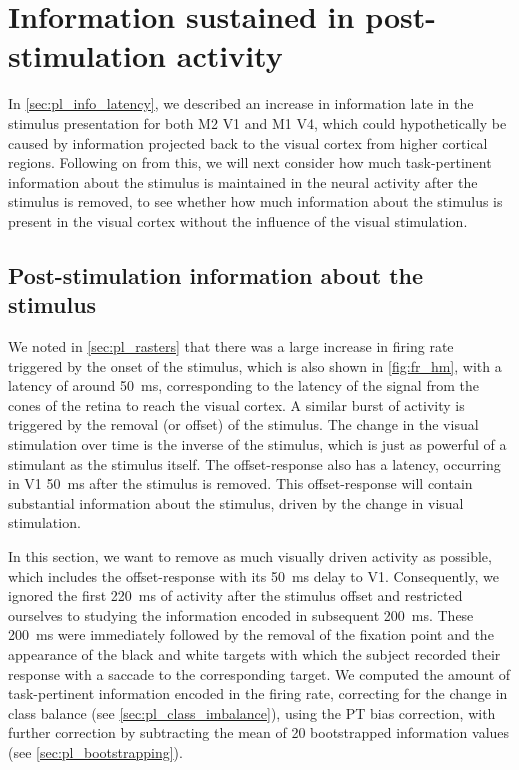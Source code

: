 \section{Information sustained in post-stimulation activity}

In \autoref{sec:pl_info_latency}, we described an increase in information late in the stimulus presentation for both \ac{M2} \ac{V1} and \ac{M1} \ac{V4}, which could hypothetically be caused by information projected back to the visual cortex from higher cortical regions.
Following on from this, we will next consider how much task-pertinent information about the stimulus is maintained in the neural activity after the stimulus is removed, to see whether how much information about the stimulus is present in the visual cortex without the influence of the visual stimulation.


\subsection{Post-stimulation information about the stimulus}

We noted in \autoref{sec:pl_rasters} that there was a large increase in firing rate triggered by the onset of the stimulus, which is also shown in \autoref{fig:fr_hm}, with a latency of around \SI{50}{\milli\second}, corresponding to the latency of the signal from the cones of the retina to reach the visual cortex.
A similar burst of activity is triggered by the removal (or offset) of the stimulus.
The change in the visual stimulation over time is the inverse of the stimulus, which is just as powerful of a stimulant as the stimulus itself.
The offset-response also has a latency, occurring in \ac{V1} \SI{50}{\milli\second} after the stimulus is removed.
This offset-response will contain substantial information about the stimulus, driven by the change in visual stimulation.

In this section, we want to remove as much visually driven activity as possible, which includes the offset-response with its \SI{50}{\milli\second} delay to \ac{V1}.
Consequently, we ignored the first \SI{220}{\milli\second} of activity after the stimulus offset and restricted ourselves to studying the information encoded in subsequent \SI{200}{\milli\second}.
These \SI{200}{\milli\second} were immediately followed by the removal of the fixation point and the appearance of the black and white targets with which the subject recorded their response with a saccade to the corresponding target.
We computed the amount of task-pertinent information encoded in the firing rate, correcting for the change in class balance (see \autoref{sec:pl_class_imbalance}), using the \ac{PT} bias correction, with further correction by subtracting the mean of \num{20} bootstrapped information values (see \autoref{sec:pl_bootstrapping}).

